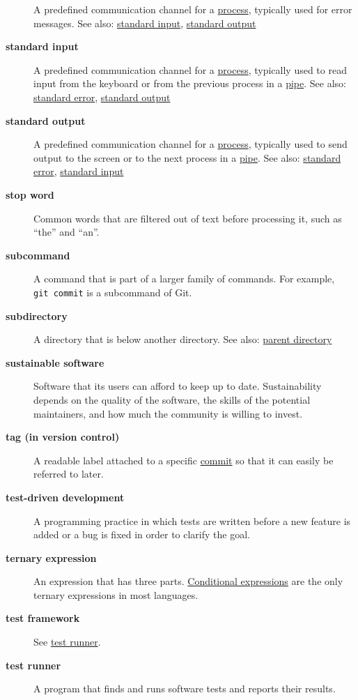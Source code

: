 \documentclass[
]{krantz}
\begin{document}
\begin{description}
A predefined communication channel for a \protect\hyperlink{process}{process}, typically used for error messages. See also: \protect\hyperlink{stdin}{standard input}, \protect\hyperlink{stdout}{standard output}
\item[\textbf{standard input}]
A predefined communication channel for a \protect\hyperlink{process}{process}, typically used to read input from the keyboard or from the previous process in a \protect\hyperlink{pipe_shell}{pipe}. See also: \protect\hyperlink{stderr}{standard error}, \protect\hyperlink{stdout}{standard output}
\item[\textbf{standard output}]
A predefined communication channel for a \protect\hyperlink{process}{process}, typically used to send output to the screen or to the next process in a \protect\hyperlink{pipe_shell}{pipe}. See also: \protect\hyperlink{stderr}{standard error}, \protect\hyperlink{stdin}{standard input}
\item[\textbf{stop word}]
Common words that are filtered out of text before processing it, such as ``the'' and ``an''.
\item[\textbf{subcommand}]
A command that is part of a larger family of commands. For example, \texttt{git\ commit} is a subcommand of Git.
\item[\textbf{subdirectory}]
A directory that is below another directory. See also: \protect\hyperlink{parent_directory}{parent directory}
\item[\textbf{sustainable software}]
Software that its users can afford to keep up to date. Sustainability depends on the quality of the software, the skills of the potential maintainers, and how much the community is willing to invest.
\item[\textbf{tag (in version control)}]
A readable label attached to a specific \protect\hyperlink{commit}{commit} so that it can easily be referred to later.
\item[\textbf{test-driven development}]
A programming practice in which tests are written before a new feature is added or a bug is fixed in order to clarify the goal.
\item[\textbf{ternary expression}]
An expression that has three parts. \protect\hyperlink{conditional_expression}{Conditional expressions} are the only ternary expressions in most languages.
\item[\textbf{test framework}]
See \protect\hyperlink{test_runner}{test runner}.
\item[\textbf{test runner}]
A program that finds and runs software tests and reports their results.

\end{description}
\end{document}
